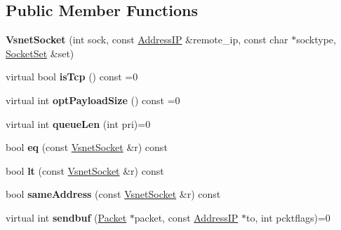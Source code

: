 \subsection*{Public Member Functions}
\begin{DoxyCompactItemize}
\item 
{\bfseries Vsnet\+Socket} (int sock, const \hyperlink{structAddressIP}{Address\+IP} \&remote\+\_\+ip, const char $\ast$socktype, \hyperlink{classSocketSet}{Socket\+Set} \&set)\hypertarget{classVsnetSocket_a45c0ab5911f17c6abe870e2c2686e8b9}{}\label{classVsnetSocket_a45c0ab5911f17c6abe870e2c2686e8b9}

\item 
virtual bool {\bfseries is\+Tcp} () const =0\hypertarget{classVsnetSocket_a46d75a53fc32006d6497a9d4f7888be8}{}\label{classVsnetSocket_a46d75a53fc32006d6497a9d4f7888be8}

\item 
virtual int {\bfseries opt\+Payload\+Size} () const =0\hypertarget{classVsnetSocket_ab9cd1c83f2aad6b6c205c61bdac64044}{}\label{classVsnetSocket_ab9cd1c83f2aad6b6c205c61bdac64044}

\item 
virtual int {\bfseries queue\+Len} (int pri)=0\hypertarget{classVsnetSocket_a1d6a1f690b2f3afd52e75f454fd4193f}{}\label{classVsnetSocket_a1d6a1f690b2f3afd52e75f454fd4193f}

\item 
bool {\bfseries eq} (const \hyperlink{classVsnetSocket}{Vsnet\+Socket} \&r) const \hypertarget{classVsnetSocket_ac878d5a3f8af1284bd0984f23d4a2b3c}{}\label{classVsnetSocket_ac878d5a3f8af1284bd0984f23d4a2b3c}

\item 
bool {\bfseries lt} (const \hyperlink{classVsnetSocket}{Vsnet\+Socket} \&r) const \hypertarget{classVsnetSocket_acc676d0c1fd84d5903b1352499cdd71d}{}\label{classVsnetSocket_acc676d0c1fd84d5903b1352499cdd71d}

\item 
bool {\bfseries same\+Address} (const \hyperlink{classVsnetSocket}{Vsnet\+Socket} \&r) const \hypertarget{classVsnetSocket_a5ecdf91d45b5b6cb2fccbac998a3bab1}{}\label{classVsnetSocket_a5ecdf91d45b5b6cb2fccbac998a3bab1}

\item 
virtual int {\bfseries sendbuf} (\hyperlink{classPacket}{Packet} $\ast$packet, const \hyperlink{structAddressIP}{Address\+IP} $\ast$to, int pcktflags)=0\hypertarget{classVsnetSocket_abbbdda333f86d43ec40103082e44e6e1}{}\label{classVsnetSocket_abbbdda333f86d43ec40103082e44e6e1}


\end{DoxyCompactItemize}

